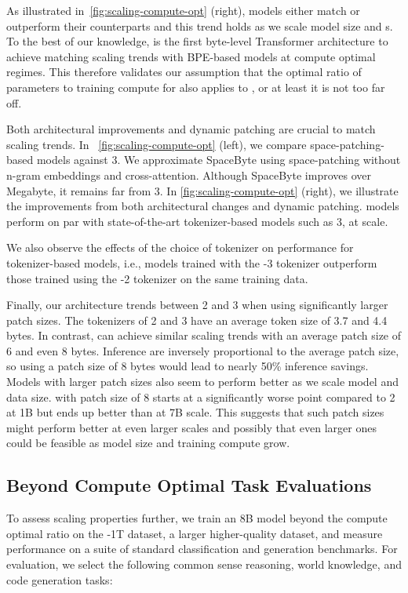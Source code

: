 \documentclass[]{fairmeta}
\begin{document}
As illustrated in~\autoref{fig:scaling-compute-opt} (right), \model{} models either match or outperform their \bpe{} counterparts and this trend holds as we scale model size and \flop{}s. To the best of our knowledge, \model{} is the first byte-level Transformer architecture to achieve matching scaling trends with BPE-based models at compute optimal regimes. This therefore validates our assumption that the optimal ratio of parameters to training compute for \bpe{} also applies to \model{}, or at least it is not too far off.     

Both architectural improvements and dynamic patching are crucial to match \bpe{} scaling trends. In ~\autoref{fig:scaling-compute-opt} (left), we compare space-patching-based models against \llama{} 3. We approximate SpaceByte \citep{slagle2024spacebyte} using \model{} space-patching without n-gram embeddings and cross-attention. 
Although SpaceByte improves over Megabyte, it remains far from  \llama{} 3. In \autoref{fig:scaling-compute-opt} (right), we illustrate the improvements from both architectural changes and dynamic patching. \model{} models perform on par with state-of-the-art tokenizer-based models such as  \llama{} 3, at scale.
 
We also observe the effects of the choice of tokenizer on performance for tokenizer-based models, i.e., models trained with the \llama{}-3 tokenizer outperform those trained using the \llama{}-2 tokenizer on the same training data.

Finally, our \model{} architecture trends between \llama{} 2 and 3 when using significantly larger patch sizes. The \bpe{} tokenizers of \llama{} 2 and 3 have an average token size of 3.7 and 4.4 bytes. In contrast, \model{} can achieve similar scaling trends with an average patch size of 6 and even 8 bytes. Inference \flop{} are inversely proportional to the average patch size, so using a patch size of 8 bytes would lead to nearly 50\% inference \flop{} savings. 
Models with larger patch sizes also seem to perform better as we scale model and data size. \model{} with patch size of 8 starts at a significantly worse point compared to \bpe{} \llama{} 2 at 1B but ends up better than \bpe{} at 7B scale. This suggests that such patch sizes might perform better at even larger scales and possibly that even larger ones could be feasible as model size and training compute grow. 


\subsection{Beyond Compute Optimal Task Evaluations}
\label{section:evals}
To assess scaling properties further, we train an 8B \model{} model beyond the compute optimal ratio on the \model{}-1T dataset, a larger higher-quality dataset, and measure performance on a suite of standard classification and generation benchmarks. For evaluation, we select the following common sense reasoning, world knowledge, and code generation tasks:
\end{document}
